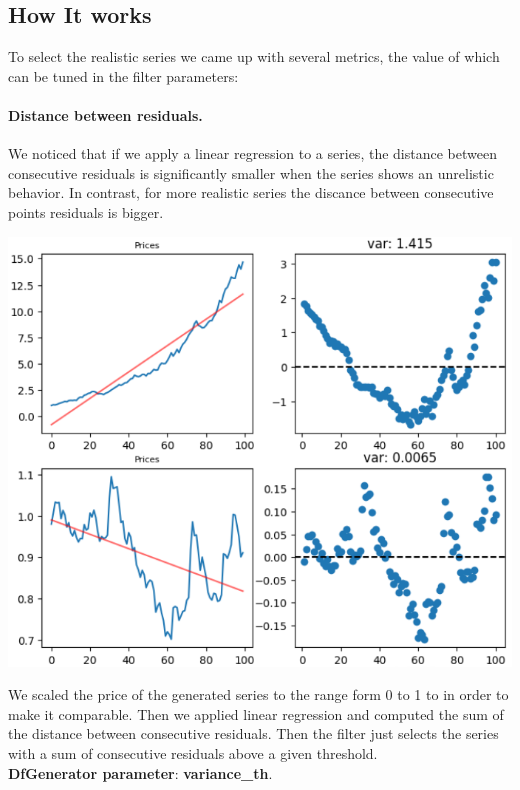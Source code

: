 \documentclass{article}
\begin{document}
\begin{multicols}{2}
    \section*{How It works}
    To select the realistic series we came up with several metrics, the value of which can be tuned in the filter parameters:
    \paragraph*{Distance between residuals.}
    We noticed that if we apply a linear regression to a series, the distance between consecutive residuals is significantly smaller when the series shows an unrelistic behavior.
    In contrast, for more realistic series the discance between consecutive points residuals is bigger.
    \begin{center}
        \includegraphics[scale=0.6]{imgs/riccardo/2_res.png}
    \end{center}
    We scaled the price of the generated series to the range form 0 to 1 to in order to make it comparable. Then we applied linear regression and computed the sum of the distance between consecutive residuals. 
    Then the filter just selects the series with a sum of consecutive residuals above a given threshold.\\
    \textbf{DfGenerator parameter}:  \textbf{variance\_th}.

\end{multicols}
\end{document}
